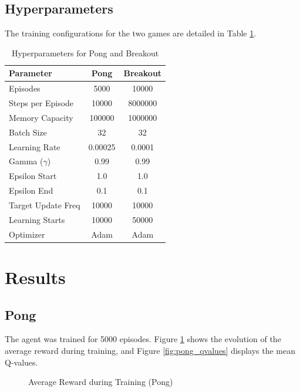 \documentclass{article}
\begin{document}
\subsection{Hyperparameters}
The training configurations for the two games are detailed in Table \ref{tab:hyperparams}.

\begin{table}[H]
    \centering
    \begin{tabular}{lcc}
        \toprule
        \textbf{Parameter} & \textbf{Pong} & \textbf{Breakout} \\
        \midrule
        Episodes & 5000 & 10000 \\
        Steps per Episode & 10000 & 8000000 \\
        Memory Capacity & 100000 & 1000000 \\
        Batch Size & 32 & 32 \\
        Learning Rate & 0.00025 & 0.0001 \\
        Gamma ($\gamma$) & 0.99 & 0.99 \\
        Epsilon Start & 1.0 & 1.0 \\
        Epsilon End & 0.1 & 0.1 \\
        Target Update Freq & 10000 & 10000 \\
        Learning Starts & 10000 & 50000 \\
        Optimizer & Adam & Adam \\
        \bottomrule
    \end{tabular}
    \caption{Hyperparameters for Pong and Breakout}
    \label{tab:hyperparams}
\end{table}

\section{Results}

\subsection{Pong}
The agent was trained for 5000 episodes. Figure \ref{fig:pong_reward} shows the evolution of the average reward during training, and Figure \ref{fig:pong_qvalues} displays the mean Q-values.

\begin{figure}[H]
    \centering
    
    \caption{Average Reward during Training (Pong)}
    \label{fig:pong_reward}
\end{figure}
\end{document}
